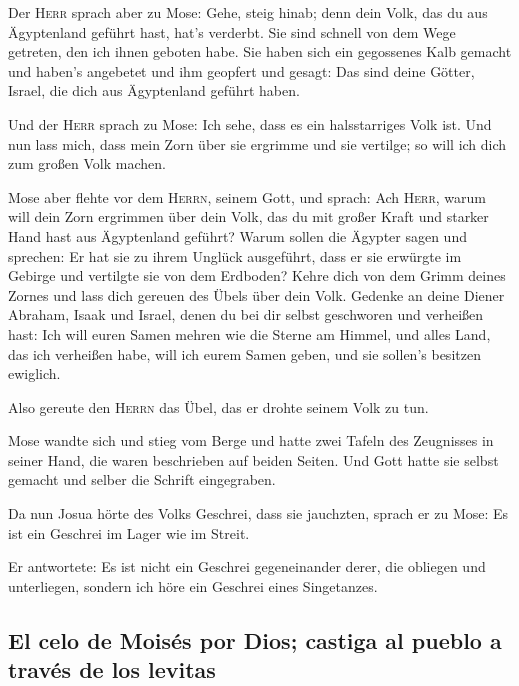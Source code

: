  Der \textsc{Herr} sprach aber zu Mose: Gehe, steig hinab;
denn dein Volk, das du aus Ägyptenland geführt hast, hat's verderbt.
 Sie sind schnell von dem Wege getreten, den ich ihnen
geboten habe. Sie haben sich ein gegossenes Kalb gemacht und haben's
angebetet und ihm geopfert und gesagt: Das sind deine Götter, Israel,
die dich aus Ägyptenland geführt haben.

 Und der \textsc{Herr} sprach zu Mose: Ich sehe, dass es
ein halsstarriges Volk ist.  Und nun lass mich, dass mein
Zorn über sie ergrimme und sie vertilge; so will ich dich zum großen
Volk machen.

 Mose aber flehte vor dem \textsc{Herrn}, seinem Gott,
und sprach: Ach \textsc{Herr}, warum will dein Zorn ergrimmen über dein
Volk, das du mit großer Kraft und starker Hand hast aus Ägyptenland
geführt?  Warum sollen die Ägypter sagen und sprechen: Er
hat sie zu ihrem Unglück ausgeführt, dass er sie erwürgte im Gebirge und
vertilgte sie von dem Erdboden? Kehre dich von dem Grimm deines Zornes
und lass dich gereuen des Übels über dein Volk.  Gedenke
an deine Diener Abraham, Isaak und Israel, denen du bei dir selbst
geschworen und verheißen hast: Ich will euren Samen mehren wie die
Sterne am Himmel, und alles Land, das ich verheißen habe, will ich eurem
Samen geben, und sie sollen's besitzen ewiglich.

 Also gereute den \textsc{Herrn} das Übel, das er drohte
seinem Volk zu tun.

 Mose wandte sich und stieg vom Berge und hatte zwei
Tafeln des Zeugnisses in seiner Hand, die waren beschrieben auf beiden
Seiten.  Und Gott hatte sie selbst gemacht und selber die
Schrift eingegraben.

 Da nun Josua hörte des Volks Geschrei, dass sie
jauchzten, sprach er zu Mose: Es ist ein Geschrei im Lager wie im
Streit.

 Er antwortete: Es ist nicht ein Geschrei gegeneinander
derer, die obliegen und unterliegen, sondern ich höre ein Geschrei eines
Singetanzes.

\hypertarget{el-celo-de-moisuxe9s-por-dios-castiga-al-pueblo-a-travuxe9s-de-los-levitas}{%
\subsection{El celo de Moisés por Dios; castiga al pueblo a través de
los
levitas}\label{el-celo-de-moisuxe9s-por-dios-castiga-al-pueblo-a-travuxe9s-de-los-levitas}}

